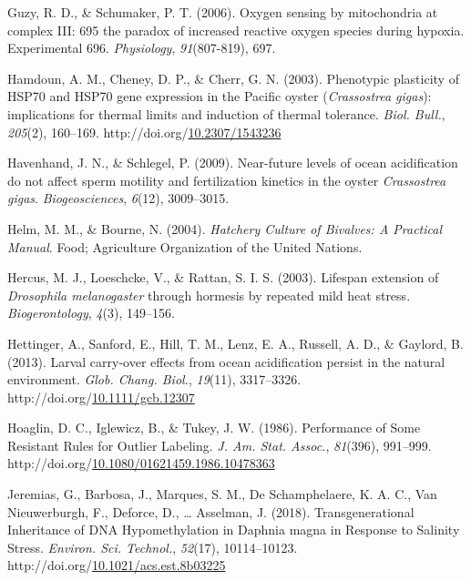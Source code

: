 \documentclass [11pt, proquest] {uwthesis}[2015/03/03]
\newlength{\cslhangindent}
\newenvironment{CSLReferences}%
{\setlength{\parindent}{0pt}%
\everypar{\setlength{\hangindent}{\cslhangindent}}\ignorespaces}%
{\par}
\begin{document}
\begin{CSLReferences}{1}{0}
\leavevmode\hypertarget{ref-Guzy2006}{}%
Guzy, R. D., \& Schumaker, P. T. (2006). {Oxygen sensing by mitochondria at complex III: 695 the paradox of increased reactive oxygen species during hypoxia. Experimental 696}. \emph{Physiology}, \emph{91}(807-819), 697.

\leavevmode\hypertarget{ref-Hamdoun2003}{}%
Hamdoun, A. M., Cheney, D. P., \& Cherr, G. N. (2003). {Phenotypic plasticity of HSP70 and HSP70 gene expression in the Pacific oyster (\emph{Crassostrea gigas}): implications for thermal limits and induction of thermal tolerance}. \emph{Biol. Bull.}, \emph{205}(2), 160--169. http://doi.org/\href{https://doi.org/10.2307/1543236}{10.2307/1543236}

\leavevmode\hypertarget{ref-Havenhand2009}{}%
Havenhand, J. N., \& Schlegel, P. (2009). {Near-future levels of ocean acidification do not affect sperm motility and fertilization kinetics in the oyster \emph{Crassostrea gigas}}. \emph{Biogeosciences}, \emph{6}(12), 3009--3015.

\leavevmode\hypertarget{ref-Helm2004}{}%
Helm, M. M., \& Bourne, N. (2004). \emph{{Hatchery Culture of Bivalves: A Practical Manual}}. Food; Agriculture Organization of the United Nations.

\leavevmode\hypertarget{ref-Hercus2003}{}%
Hercus, M. J., Loeschcke, V., \& Rattan, S. I. S. (2003). {Lifespan extension of \emph{Drosophila melanogaster} through hormesis by repeated mild heat stress}. \emph{Biogerontology}, \emph{4}(3), 149--156.

\leavevmode\hypertarget{ref-Hettinger2013}{}%
Hettinger, A., Sanford, E., Hill, T. M., Lenz, E. A., Russell, A. D., \& Gaylord, B. (2013). {Larval carry-over effects from ocean acidification persist in the natural environment}. \emph{Glob. Chang. Biol.}, \emph{19}(11), 3317--3326. http://doi.org/\href{https://doi.org/10.1111/gcb.12307}{10.1111/gcb.12307}

\leavevmode\hypertarget{ref-Hoaglin1986}{}%
Hoaglin, D. C., Iglewicz, B., \& Tukey, J. W. (1986). {Performance of Some Resistant Rules for Outlier Labeling}. \emph{J. Am. Stat. Assoc.}, \emph{81}(396), 991--999. http://doi.org/\href{https://doi.org/10.1080/01621459.1986.10478363}{10.1080/01621459.1986.10478363}

\leavevmode\hypertarget{ref-Jeremias2018}{}%
Jeremias, G., Barbosa, J., Marques, S. M., De Schamphelaere, K. A. C., Van Nieuwerburgh, F., Deforce, D., \ldots{} Asselman, J. (2018). {Transgenerational Inheritance of DNA Hypomethylation in Daphnia magna in Response to Salinity Stress}. \emph{Environ. Sci. Technol.}, \emph{52}(17), 10114--10123. http://doi.org/\href{https://doi.org/10.1021/acs.est.8b03225}{10.1021/acs.est.8b03225}


\end{CSLReferences}
\end{document}

